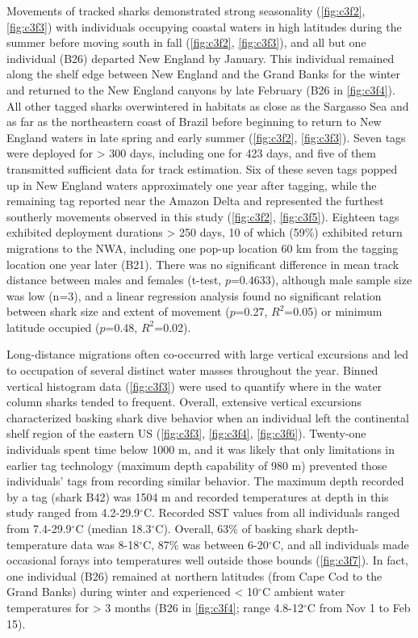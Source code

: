 Movements of tracked sharks demonstrated strong seasonality (\cref{fig:c3f2}, \cref{fig:c3f3}) with individuals occupying coastal waters in high latitudes during the summer before moving south in fall (\cref{fig:c3f2}, \cref{fig:c3f3}), and all but one individual (B26) departed New England by January. This individual remained along the shelf edge between New England and the Grand Banks for the winter and returned to the New England canyons by late February (B26 in \cref{fig:c3f4}). All other tagged sharks overwintered in habitats as close as the Sargasso Sea and as far as the northeastern coast of Brazil before beginning to return to New England waters in late spring and early summer (\cref{fig:c3f2}, \cref{fig:c3f3}). Seven tags were deployed for > 300 days, including one for 423 days, and five of them transmitted sufficient data for track estimation. Six of these seven tags popped up in New England waters approximately one year after tagging, while the remaining tag reported near the Amazon Delta and represented the furthest southerly movements observed in this study (\cref{fig:c3f2}, \cref{fig:c3f5}). Eighteen tags exhibited deployment durations > 250 days, 10 of which (59\%) exhibited return migrations to the NWA, including one pop-up location 60 km from the tagging location one year later (B21). There was no significant difference in mean track distance between males and females (t-test, $p$=0.4633), although male sample size was low (n=3), and a linear regression analysis found no significant relation between shark size and extent of movement ($p$=0.27, $R^2$=0.05) or minimum latitude occupied ($p$=0.48, $R^2$=0.02).

Long-distance migrations often co-occurred with large vertical excursions and led to occupation of several distinct water masses throughout the year. Binned vertical histogram data (\cref{fig:c3f3}) were used to quantify where in the water column sharks tended to frequent. Overall, extensive vertical excursions characterized basking shark dive behavior when an individual left the continental shelf region of the eastern US (\cref{fig:c3f3}, \cref{fig:c3f4}, \cref{fig:c3f6}). Twenty-one individuals spent time below 1000 m, and it was likely that only limitations in earlier tag technology (maximum depth capability of 980 m) prevented those individuals' tags from recording similar behavior. The maximum depth recorded by a tag (shark B42) was 1504 m and recorded temperatures at depth in this study ranged from 4.2-29.9$^{\circ}$C. Recorded SST values from all individuals ranged from 7.4-29.9$^{\circ}$C (median 18.3$^{\circ}$C). Overall, 63\% of basking shark depth-temperature data was 8-18$^{\circ}$C, 87\% was between 6-20$^{\circ}$C, and all individuals made occasional forays into temperatures well outside those bounds (\cref{fig:c3f7}). In fact, one individual (B26) remained at northern latitudes (from Cape Cod to the Grand Banks) during winter and experienced < 10$^{\circ}$C ambient water temperatures for > 3 months (B26 in \cref{fig:c3f4}; range 4.8-12$^{\circ}$C from Nov 1 to Feb 15). 

